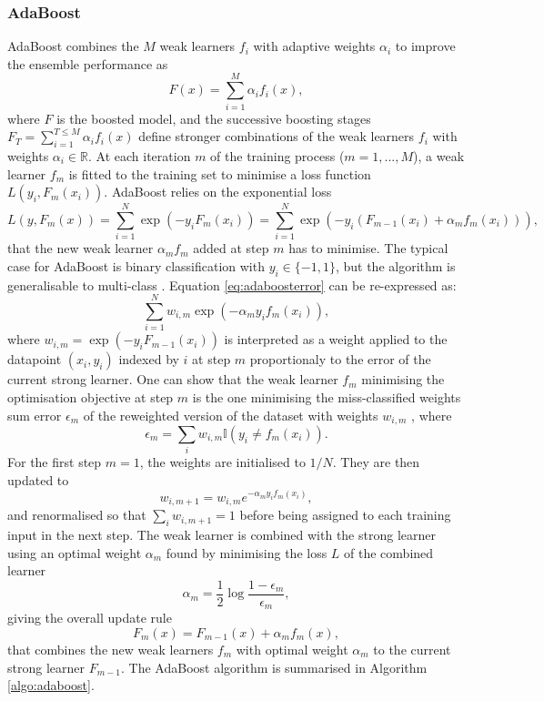\subsubsection{AdaBoost}\label{sub-adaboosted}
AdaBoost combines the $M$ weak learners $f_i$ with adaptive weights $\alpha_i$ to improve the ensemble performance as \[F(x) = \sum_{i=1}^M \alpha_i f_i(x),\] where $F$ is the boosted model, and the successive boosting stages $F_T = \sum_{i=1}^{T \leq M} \alpha_i f_i(x)$ define stronger combinations of the weak learners $f_i$ with weights $\alpha_i \in \mathbb{R}$. At each iteration $m$ of the training process ($m = 1, ..., M$), a weak learner $f_m$ is fitted to the training set to minimise a loss function $L(y_i, F_{m}(x_i))$. AdaBoost relies on the exponential loss
\begin{equation}\label{eq:adaboosterror}
    L(y, F_m(x)) = \sum_{i=1}^N \exp\left(-y_i F_m(x_i)\right) = \sum_{i=1}^N \exp\left(-y_i (F_{m-1}(x_i) + \alpha_m f_m(x_i))\right),
\end{equation}
that the new weak learner $\alpha_m f_m$ added at step $m$ has to minimise. The typical case for AdaBoost is binary classification with $y_i \in \{-1, 1\}$, but the algorithm is generalisable to multi-class \cite{MurphyML}. Equation \ref{eq:adaboosterror} can be re-expressed as: \[\sum_{i=1}^N w_{i,m} \exp\left(-\alpha_m y_i f_m(x_i)\right),\] where $w_{i,m} = \exp\left(-y_i F_{m-1}(x_i)\right)$ is interpreted as a weight applied to the datapoint $(x_i, y_i)$  indexed by $i$ at step $m$ proportionaly to the error of the current strong learner. One can show that the weak learner $f_m$ minimising the optimisation objective at step $m$ is the one minimising the miss-classified weights sum error $\epsilon_m$ of the reweighted version of the dataset with weights $w_{i,m}$ \cite{MurphyML}, where \[\epsilon_m = \sum_i w_{i,m} \mathbb{I}(y_i \neq f_m(x_i)).\] For the first step $m = 1$, the weights are initialised to $1 / N$. They are then updated to \[w_{i,m+1} = w_{i,m} e^{-\alpha_m y_i f_m(x_i)},\] and renormalised so that $\sum_i w_{i, m+1} = 1$ before being assigned to each training input in the next step. The weak learner is combined with the strong learner using an optimal weight $\alpha_m$ found by minimising the loss $L$ of the combined learner \[\alpha_m = \frac{1}{2} \log \frac{1 - \epsilon_m}{\epsilon_m},\] giving the overall update rule
\begin{equation}\label{eq:updateOverall}
    F_m(x) = F_{m-1}(x) + \alpha_m f_m(x),
\end{equation}
that combines the new weak learners $f_m$ with optimal weight $\alpha_m$ to the current strong learner $F_{m-1}$. The AdaBoost algorithm is summarised in Algorithm \ref{algo:adaboost}.

